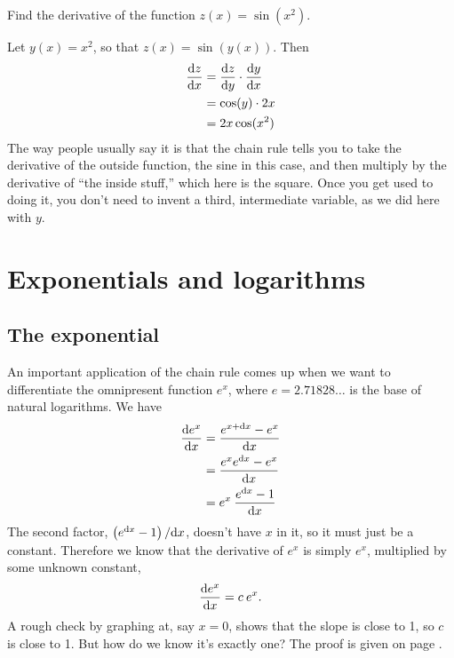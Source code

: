 \begin{eg}
\egquestion Find the derivative of the function $z(x)=\sin(x^2)$.

\eganswer Let $y(x)=x^2$, so that $z(x)=\sin(y(x))$. Then
\begin{align*}
  \frac{\textup{d} z}{\textup{d} x} &= \frac{\textup{d} z}{\textup{d} y} \cdot \frac{\textup{d} y}{\textup{d} x} \\
                        &= \cos(y) \cdot 2x \\
                        &= 2x \cos(x^2)
\end{align*}
The way people usually say it is that the chain rule tells you to take the derivative of
the outside function, the sine in this case, and then multiply by the derivative of
``the inside stuff,'' which here is the square. Once you get used to doing it, you don't
need to invent a third, intermediate variable, as we did here with $y$.
\end{eg}

\section{Exponentials and logarithms}

\subsection{The exponential}
An important application of the chain rule comes up when we want to differentiate
the omnipresent function $e^x$, where $e=2.71828\ldots$ is the base of natural
logarithms. We have
\begin{align*}
  \frac{\textup{d} e^x}{\textup{d} x} &= \frac{e^{x+\textup{d} x}-e^x}{\textup{d} x} \\
                          &= \frac{e^x e^{\textup{d} x}-e^x}{\textup{d} x} \\
                          &= e^x \: \frac{e^{\textup{d} x}-1}{\textup{d} x}
\end{align*}
The second factor, $\left(e^{\textup{d} x}-1\right)/\textup{d} x$, doesn't have $x$ in it, so it
must just be a constant. Therefore we know that the derivative of $e^x$ is simply
$e^x$, multiplied by some unknown constant,
\begin{equation*}
  \frac{\textup{d} e^x}{\textup{d} x} = c\:e^x .
\end{equation*}
A rough check by graphing at, say $x=0$, shows that the slope is close to 1, so $c$ is close to
1. But how do we know it's exactly one? The proof is given on page \pageref{detour:exp}.\label{main:exp}

